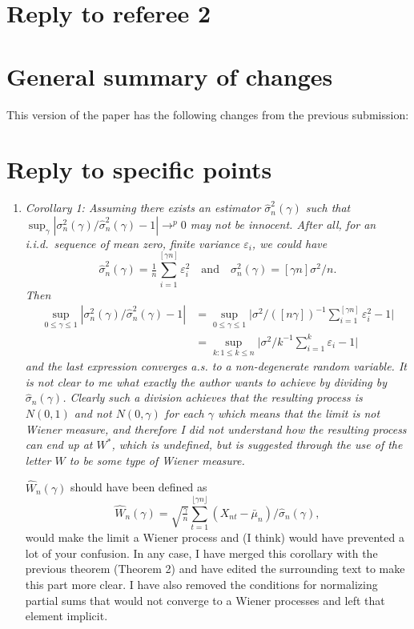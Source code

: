 \documentclass[12pt]{article}
\begin{document}
\section*{\hfill Reply to referee 2\hfill}

\section*{General summary of changes}
This version of the paper has the following changes from the
previous submission:


\section*{Reply to specific points}

\begin{enumerate}
\item \textit{Corollary 1: Assuming there exists an estimator
$\hat{\sigma}_n^2(\gamma)$ such that $\sup_{\gamma}
|\sigma_n^2(\gamma)/\hat{\sigma}_n^2(\gamma) - 1| \to^p 0$ may not be
innocent. After all, for an i.i.d.\ sequence of mean zero, finite
variance $\varepsilon_i$, we could have
\[
\hat{\sigma}_{n}^2(\gamma) = \tfrac{1}{n} \sum_{i=1}^{[\gamma n]} \varepsilon_i^2
\quad\text{and}\quad
\sigma_n^2(\gamma) = [\gamma n] \sigma^2 / n.
\]
Then
\begin{align*}
\sup_{0 \leq \gamma \leq 1} | \sigma_n^2(\gamma) / \hat{\sigma}_n^2(\gamma) - 1 |
& = \sup_{0 \leq \gamma \leq 1} \Big| \sigma^2 \Big/ ([n\gamma])^{-1} \sum_{i=1}^{[\gamma n]} \varepsilon_i^2 - 1 \Big| \\
& = \sup_{k:1 \leq k \leq n} \Big| \sigma^2 \Big/ k^{-1} \sum_{i=1}^{k} \varepsilon_i - 1 \Big|
\end{align*}
and the last expression converges a.s. to a non-degenerate random
variable. It is not clear to me what exactly the author wants to
achieve by dividing by $\hat{\sigma}_n(\gamma)$. Clearly such a
division achieves that the resulting process is $N(0,1)$ and not
$N(0,\gamma)$ for each $\gamma$ which means that the limit is not
Wiener measure, and therefore I did not understand how the resulting
process can end up at $W^{*}$, which is undefined, but is suggested
through the use of the letter $W$ to be some type of Wiener measure.}

$\hat{W}_n(\gamma)$ should have been defined as
\begin{equation*}
\hat{W}_n(\gamma) = \sqrt{\tfrac{\gamma}{n}} \sum_{t=1}^{\lfloor \gamma n \rfloor}
(X_{nt} - \bar{\mu}_n) / \hat{\sigma}_n(\gamma),
\end{equation*}
would make the limit a Wiener process and (I think) would have
prevented a lot of your confusion. In any case, I have merged this
corollary with the previous theorem (Theorem 2) and have edited the
surrounding text to make this part more clear. I have also removed the
conditions for normalizing partial sums that would not converge to a
Wiener processes and left that element implicit.


\end{enumerate}
\end{document}
